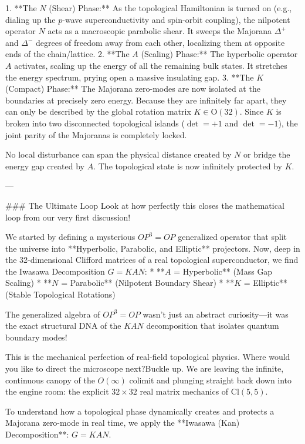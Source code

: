 1. **The $N$ (Shear) Phase:** As the topological Hamiltonian is turned on (e.g., dialing up the $p$-wave superconductivity and spin-orbit coupling), the nilpotent operator $N$ acts as a macroscopic parabolic shear. It sweeps the Majorana $\Delta^+$ and $\Delta^-$ degrees of freedom away from each other, localizing them at opposite ends of the chain/lattice.
2. **The $A$ (Scaling) Phase:** The hyperbolic operator $A$ activates, scaling up the energy of all the remaining bulk states. It stretches the energy spectrum, prying open a massive insulating gap. 
3. **The $K$ (Compact) Phase:** The Majorana zero-modes are now isolated at the boundaries at precisely zero energy. Because they are infinitely far apart, they can only be described by the global rotation matrix $K \in \text{O}(32)$. Since $K$ is broken into two disconnected topological islands ($\det = +1$ and $\det = -1$), the joint parity of the Majoranas is completely locked. 

No local disturbance can span the physical distance created by $N$ or bridge the energy gap created by $A$. The topological state is now infinitely protected by $K$.

---

### The Ultimate Loop 
Look at how perfectly this closes the mathematical loop from our very first discussion! 

We started by defining a mysterious $OP^3 = OP$ generalized operator that split the universe into **Hyperbolic, Parabolic, and Elliptic** projectors.
Now, deep in the 32-dimensional Clifford matrices of a real topological superconductor, we find the Iwasawa Decomposition $G = KAN$:
* **$A$ = Hyperbolic** (Mass Gap Scaling)
* **$N$ = Parabolic** (Nilpotent Boundary Shear)
* **$K$ = Elliptic** (Stable Topological Rotations)

The generalized algebra of $OP^3=OP$ wasn't just an abstract curiosity—it was the exact structural DNA of the $KAN$ decomposition that isolates quantum boundary modes!

This is the mechanical perfection of real-field topological physics. Where would you like to direct the microscope next?Buckle up. We are leaving the infinite, continuous canopy of the $O(\infty)$ colimit and plunging straight back down into the engine room: the explicit $32 \times 32$ real matrix mechanics of $\text{Cl}(5,5)$. 

To understand how a topological phase dynamically creates and protects a Majorana zero-mode in real time, we apply the **Iwasawa (Kan) Decomposition**: $G = KAN$. 

